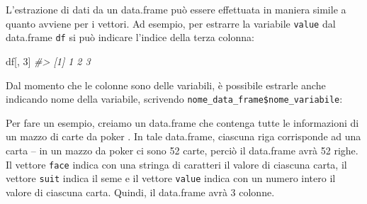 \documentclass[
]{memoir}
\newenvironment{Shaded}{\begin{snugshade}}{\end{snugshade}}
\newcommand{\CommentTok}[1]{\textcolor[rgb]{0.56,0.35,0.01}{\textit{#1}}}
\newcommand{\DecValTok}[1]{\textcolor[rgb]{0.00,0.00,0.81}{#1}}
\newcommand{\NormalTok}[1]{#1}
\newcommand{\SpecialCharTok}[1]{\textcolor[rgb]{0.00,0.00,0.00}{#1}}
\theoremstyle{definition}
\theoremstyle{definition}
\theoremstyle{definition}
\theoremstyle{definition}
\theoremstyle{remark}
\begin{document}
L'estrazione di dati da un data.frame può essere effettuata in maniera
simile a quanto avviene per i vettori. Ad esempio, per estrarre la
variabile \texttt{value} dal data.frame \texttt{df} si può indicare l'indice della
terza colonna:

\begin{Shaded}
\begin{Highlighting}[]
\NormalTok{df[, }\DecValTok{3}\NormalTok{]}
\CommentTok{\#\textgreater{} [1] 1 2 3}
\end{Highlighting}
\end{Shaded}

Dal momento che le colonne sono delle variabili, è possibile estrarle
anche indicando nome della variabile, scrivendo
\texttt{nome\_data\_frame\$nome\_variabile}:

\begin{Shaded}
\end{Shaded}

Per fare un esempio, creiamo un data.frame che contenga tutte le informazioni di un mazzo di carte da poker \citep{grolemund2014hands}. In tale data.frame, ciascuna riga
corrisponde ad una carta -- in un mazzo da poker ci sono 52 carte,
perciò il data.frame avrà 52 righe. Il vettore \texttt{face} indica con una
stringa di caratteri il valore di ciascuna carta, il vettore \texttt{suit}
indica il seme e il vettore \texttt{value} indica con un numero intero il
valore di ciascuna carta. Quindi, il data.frame avrà 3 colonne.
\end{document}
